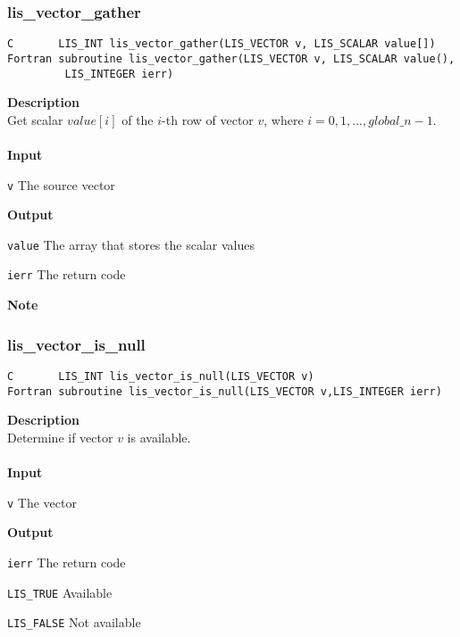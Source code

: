 \documentclass[a4paper]{article}
\newcommand{\namelistlabel}[1]{\mbox{#1}\hfill}
\newenvironment{namelist}[1]{%
\begin{list}{}
  {\let\makelabel\namelistlabel
  \settowidth{\labelwidth}{#1}
  \setlength{\leftmargin}{1.1\labelwidth}}
  }{%
\end{list}}
\begin{document}
\newpage
\subsubsection{lis\_vector\_gather}
\begin{screen}
\verb|C       LIS_INT lis_vector_gather(LIS_VECTOR v, LIS_SCALAR value[])|\\
\verb|Fortran subroutine lis_vector_gather(LIS_VECTOR v, LIS_SCALAR value(),|\\
\verb|         LIS_INTEGER ierr)|
\end{screen}
{\bf Description}\\
\indent
Get scalar $value[i]$ of the $i$-th row of vector $v$, 
where $i=0,1,..., global\_n-1$.
\\ \\
\noindent
{\bf Input}
\begin{namelist}{XXXXXXXXXXXXXXXXXXXX}
\item[\tt v] The source vector
\end{namelist}
{\bf Output}
\begin{namelist}{XXXXXXXXXXXXXXXXXXXX}
\item[\tt value] The array that stores the scalar values
\item[\tt ierr] The return code
\end{namelist}
{\bf Note}\\
\indent

\subsubsection{lis\_vector\_is\_null}
\begin{screen}
\verb|C       LIS_INT lis_vector_is_null(LIS_VECTOR v)|\\
\verb|Fortran subroutine lis_vector_is_null(LIS_VECTOR v,LIS_INTEGER ierr)|
\end{screen}
{\bf Description}\\
\indent
Determine if vector $v$ is available. 
\\ \\
\noindent
{\bf Input}
\begin{namelist}{XXXXXXXXXXXXXXXXXXXX}
\item[\tt v] The vector
\end{namelist}
{\bf Output}
\begin{namelist}{XXXXXXXXXXXXXXXXXXXX}
\item[\tt ierr] The return code
\begin{namelist}{XXXXXXXXXXXXXXXXXXXX}
\item[\tt LIS\_TRUE] Available
\item[\tt LIS\_FALSE] Not available  
\end{namelist}
\end{namelist}
\end{document}

